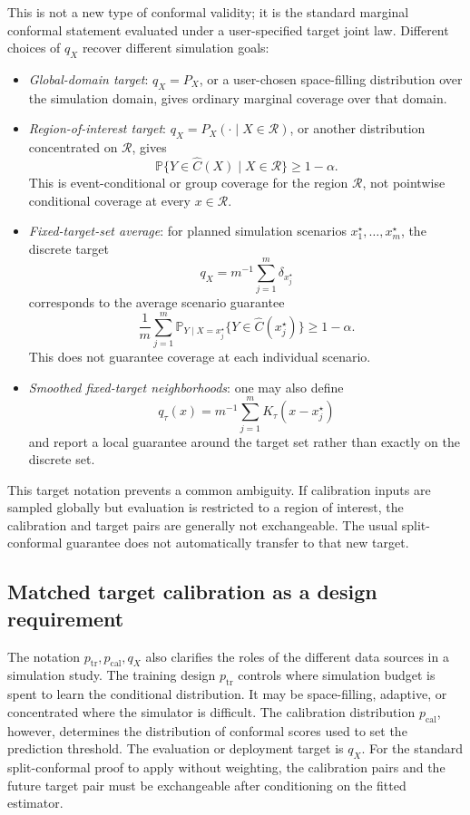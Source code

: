 \documentclass[11pt]{article}
\newcommand{\Pp}{\mathbb P}
\begin{document}
This is not a new type of conformal validity; it is the standard marginal conformal statement evaluated under a user-specified target joint law. Different choices of \(q_X\) recover different simulation goals:
\begin{itemize}[leftmargin=1.7em]
  \item \emph{Global-domain target}: \(q_X=P_X\), or a user-chosen space-filling distribution over the simulation domain, gives ordinary marginal coverage over that domain.
  \item \emph{Region-of-interest target}: \(q_X=P_X(\cdot\mid X\in\mathcal R)\), or another distribution concentrated on \(\mathcal R\), gives
  \[
    \Pp\{Y\in\widehat C(X)\mid X\in\mathcal R\}\ge 1-\alpha.
  \]
  This is event-conditional or group coverage for the region \(\mathcal R\), not pointwise conditional coverage at every \(x\in\mathcal R\).
  \item \emph{Fixed-target-set average}: for planned simulation scenarios \(x_1^\star,\ldots,x_m^\star\), the discrete target
  \[
    q_X=m^{-1}\sum_{j=1}^m\delta_{x_j^\star}
  \]
  corresponds to the average scenario guarantee
  \[
    \frac{1}{m}\sum_{j=1}^m
    \Pp_{Y\mid X=x_j^\star}\{Y\in\widehat C(x_j^\star)\}\ge 1-\alpha.
  \]
  This does not guarantee coverage at each individual scenario.
  \item \emph{Smoothed fixed-target neighborhoods}: one may also define
  \[
    q_\tau(x)=m^{-1}\sum_{j=1}^m K_\tau(x-x_j^\star)
  \]
  and report a local guarantee around the target set rather than exactly on the discrete set.
\end{itemize}

This target notation prevents a common ambiguity. If calibration inputs are sampled globally but evaluation is restricted to a region of interest, the calibration and target pairs are generally not exchangeable. The usual split-conformal guarantee does not automatically transfer to that new target.

\subsection{Matched target calibration as a design requirement}

The notation \(p_{\mathrm{tr}},p_{\mathrm{cal}},q_X\) also clarifies the roles of the different data sources in a simulation study. The training design \(p_{\mathrm{tr}}\) controls where simulation budget is spent to learn the conditional distribution. It may be space-filling, adaptive, or concentrated where the simulator is difficult. The calibration distribution \(p_{\mathrm{cal}}\), however, determines the distribution of conformal scores used to set the prediction threshold. The evaluation or deployment target is \(q_X\). For the standard split-conformal proof to apply without weighting, the calibration pairs and the future target pair must be exchangeable after conditioning on the fitted estimator.
\end{document}
